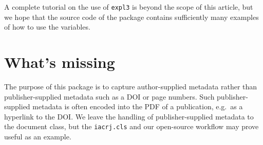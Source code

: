 \documentclass{article}
\newcommand{\cmd}[2][]{%
  \def\FirstArg{#1}%
  \ifx\FirstArg\empty%
    \texttt{\textbackslash{}#2}%
  \else%
    \texttt{\textbackslash{}#2\{#1\}}%
  \fi
}
\newcommand{\pkg}[1]{\texttt{#1}}
\begin{document}
\begin{table}
\begin{smalltcolorbox}
\end{smalltcolorbox}

\caption{Internal variables that are set by calls to \cmd{addauthor}, \cmd{addaffiliation}, \cmd{addfunder},
\cmd{addkeywords}, \cmd{title}, \cmd{subtitle}, and \cmd{license}. Some of these are LaTeX3-specific, as indicated
by the name used for them. All of these are available at the end of the preamble, because the commands to set
them may only be used in the preamble.}
\end{table}

A complete tutorial on the use of \texttt{expl3} is beyond the scope
of this article, but we hope that the source code of the package
contains sufficiently many examples of how to use the variables.

\section{What's missing}\label{missing}
The purpose of this package is to capture author-supplied metadata rather
than publisher-supplied metadata such as a DOI or page numbers. Such
publisher-supplied metadata is often encoded into the PDF of a
publication, e.g.\ as a hyperlink to the DOI. We leave the handling of
publisher-supplied metadata to the document class, but the \pkg{iacrj.cls}
and our open-source workflow may prove useful as an example.
\end{document}
